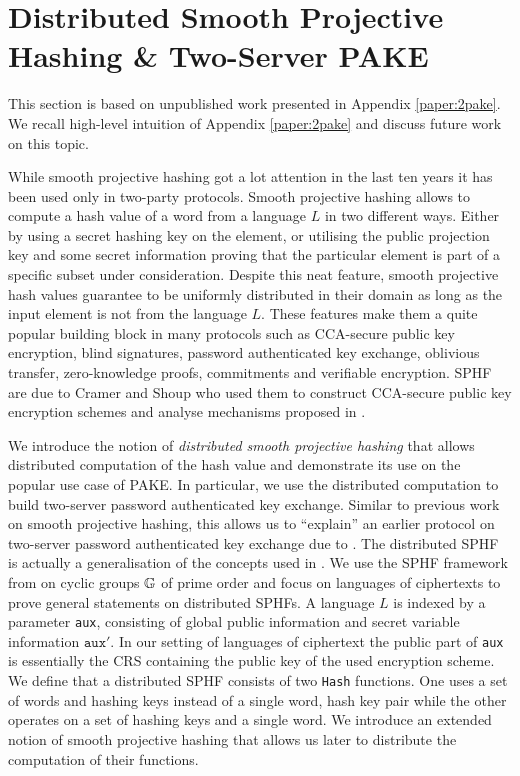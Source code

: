 \section{Distributed Smooth Projective Hashing \& Two-Server PAKE} \label{sec:twopake}
This section is based on unpublished work presented in Appendix \ref{paper:2pake}.
We recall high-level intuition of Appendix \ref{paper:2pake} and discuss future work on this topic.

While smooth projective hashing got a lot attention in the last ten years it has been used only in two-party protocols.
Smooth projective hashing allows to compute a hash value of a word from a language $L$ in two different ways.
Either by using a secret hashing key on the element, or utilising the public projection key and some secret information proving that the particular element is part of a specific subset under consideration.
Despite this neat feature, smooth projective hash values guarantee to be uniformly distributed in their domain as long as the input element is not from the language $L$.
These features make them a quite popular building block in many protocols such as \ac{CCA}-secure public key encryption, blind signatures, password authenticated key exchange, oblivious transfer, zero-knowledge proofs, commitments and verifiable encryption.
\ac{SPHF} are due to Cramer and Shoup \cite{Cramer2001} who used them to construct \ac{CCA}-secure public key encryption schemes and analyse mechanisms proposed in \cite{Cramer1998}.

We introduce the notion of \emph{distributed smooth projective hashing} that allows distributed computation of the hash value and demonstrate its use on the popular use case of \acl{PAKE}.
In particular, we use the distributed computation to build two-server password authenticated key exchange.
Similar to previous work on smooth projective hashing, this allows us to ``explain'' an earlier protocol on two-server password authenticated key exchange due to \citeauthor{Katz2012a} \cite{Katz2012a}.
The distributed \ac{SPHF} is actually a generalisation of the concepts used in \cite{Katz2012a}.
We use the \ac{SPHF} framework from \cite{Benhamouda2013} on cyclic groups $\mathbb{G}$ of prime order and focus on languages of ciphertexts to prove general statements on distributed \acp{SPHF}.
A language $L$ is indexed by a parameter \texttt{aux}, consisting of global public information and secret variable information $\mathtt{aux}'$.
In our setting of languages of ciphertext the public part of \texttt{aux} is essentially the \ac{CRS} containing the public key of the used encryption scheme.
We define that a distributed \ac{SPHF} consists of two \texttt{Hash} functions.
One uses a set of words and hashing keys instead of a single word, hash key pair while the other operates on a set of hashing keys and a single word.
We introduce an extended notion of smooth projective hashing that allows us later to distribute the computation of their functions.

